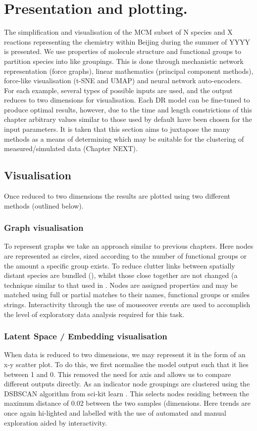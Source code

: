 
\section{Presentation and plotting.}
The simplification and visualisation of the MCM subset of N species and X reactions representing the chemistry within Beijing during the summer of YYYY is presented. We use properties of molecule structure and functional groups to partition species into like groupings. This is done through mechanistic network representation (force graphs), linear mathematics (principal component methods), force-like visualisation (t-SNE and UMAP) and neural network auto-encoders. For each example, several types of possible inputs are used, and the output reduces to two dimensions for visualisation. Each DR model can be fine-tuned to produce optimal results, however, due to the time and length constrictions of this chapter arbitrary values similar to those used by default have been chosen for the input parameters. It is taken that this section aims to juxtapose the many methods as a means of determining which may be suitable for the clustering of measured/simulated data (Chapter NEXT).

\subsection{Visualisation}
Once reduced to two dimensions the results are plotted using two different methods (outlined below).

\subsubsection{Graph visualisation}
To represent graphs we take an approach similar to previous chapters. Here nodes are represented as circles, sized according to the number of functional groups or the amount a specific group exists. To reduce clutter links between spatially distant species are bundled (\cite{edgebundle}), whilst those close together are not changed (a technique similar to that used in \cite{graphtsne}. Nodes are assigned properties and may be matched using full or partial matches to their names, functional groups or smiles strings. Interactivity through the use of mouseover events are used to accomplish the level of exploratory data analysis required for this task.

\subsubsection{Latent Space / Embedding visualisation}
When data is reduced to two dimensions, we may represent it in the form of an x-y scatter plot. To do this, we first normalise the model output such that it lies between 1 and 0. This removed the need for axis and allows us to compare different outputs directly. As an indicator node groupings are clustered using the DSBSCAN algorithm from sci-kit learn \cite{scikit,DBSCAN}. This selects nodes residing between the maximum distance of 0.02 between the two samples (dimensions. Here trends are once again hi-lighted and labelled with the use of automated and manual exploration aided by interactivity.

